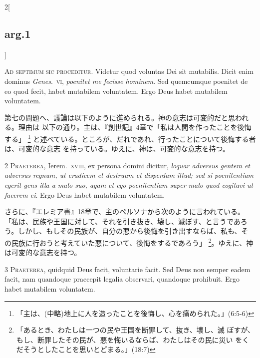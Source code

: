 \documentclass[paper=a4paper,fontsize=10pt,jafontsize=9pt,titlepage]{jlreq}
\begin{document}
\begin{paracol}{2}[\subsection{arg.1}]


{\huge A}{\scshape d septimum sic proceditur}. Videtur quod
 voluntas Dei sit mutabilis. Dicit enim dominus {\itshape Genes}.~{\scshape vi}, {\itshape poenitet me
 fecisse hominem}. Sed quemcumque poenitet de eo quod fecit, habet
 mutabilem voluntatem. Ergo Deus habet mutabilem voluntatem.

\switchcolumn

第七の問題へ、議論は以下のように進められる。神の意志は可変的だと思われる。理由は
以下の通り。主は、『創世記』4章で「私は人間を作ったことを後悔する」
\footnote{「主は、(中略)地上に人を造ったことを後悔し、心を痛められた。」(6:5-6)}
と述べている。ところが、だれであれ、行ったことについて後悔する者は、可変的な意志
を持っている。ゆえに、神は、可変的な意志を持つ。



{\scshape 2 Praeterea}, Ierem.~{\scshape xviii}, ex persona domini
 dicitur, {\itshape loquar adversus gentem et adversus regnum, ut eradicem et
 destruam et disperdam illud; sed si poenitentiam egerit gens illa a
 malo suo, agam et ego poenitentiam super malo quod cogitavi ut facerem
 ei}. Ergo Deus habet mutabilem voluntatem.

\switchcolumn

さらに、『エレミア書』18章で、主のペルソナから次のように言われている。
 「私は、民族や王国に対して、それを引き抜き、壊し、滅ぼす、と言うであろ
 う。しかし、もしその民族が、自分の悪から後悔を引き出すならば、私も、そ
 の民族に行おうと考えていた悪について、後悔をするであろう」
 \footnote{「あるとき、わたしは一つの民や王国を断罪して、抜き、壊し、滅
 ぼすが、もし、断罪したその民が、悪を悔いるならば、わたしはその民に災い
 をくだそうとしたことを思いとどまる。」(18:7)}。ゆえに、神
 は可変的な意志を持つ。



{\scshape 3 Praeterea}, quidquid Deus facit, voluntarie
 facit. Sed Deus non semper eadem facit, nam quandoque praecepit legalia
 observari, quandoque prohibuit. Ergo habet mutabilem voluntatem.


\end{paracol}
\end{document}
